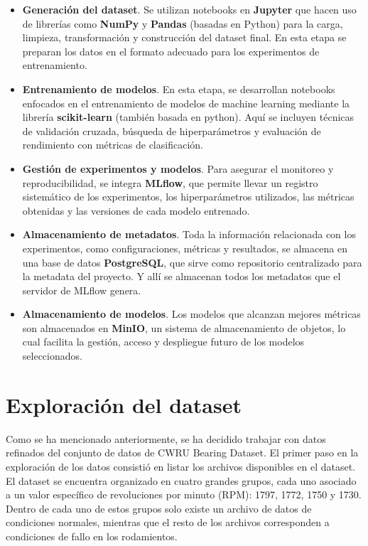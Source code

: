 \documentclass[11pt,a4paper,spanish]{book}
\numberwithin{equation}{chapter}
\numberwithin{figure}{chapter}
\begin{document}
\begin{itemize}

\item \textbf{Generación del dataset}. Se utilizan notebooks en \textbf{Jupyter} que hacen uso de librerías como \textbf{NumPy} y \textbf{Pandas} (basadas en Python) para la carga, limpieza, transformación y construcción del dataset final. En esta etapa se preparan los datos en el formato adecuado para los experimentos de entrenamiento.


\item \textbf{Entrenamiento de modelos}. En esta etapa, se desarrollan notebooks enfocados en el entrenamiento de modelos de machine learning mediante la librería \textbf{scikit-learn} (también basada en python). Aquí se incluyen técnicas de validación cruzada, búsqueda de hiperparámetros y evaluación de rendimiento con métricas de clasificación.


\item \textbf{Gestión de experimentos y modelos}. Para asegurar el monitoreo y reproducibilidad, se integra \textbf{MLflow}, que permite llevar un registro sistemático de los experimentos, los hiperparámetros utilizados, las métricas obtenidas y las versiones de cada modelo entrenado.


\item \textbf{Almacenamiento de metadatos}.  Toda la información relacionada con los experimentos, como configuraciones, métricas y resultados, se almacena en una base de datos \textbf{PostgreSQL}, que sirve como repositorio centralizado para la metadata del proyecto. Y allí se almacenan todos los metadatos que el servidor de MLflow genera. 


\item \textbf{Almacenamiento de modelos}. Los modelos que alcanzan mejores métricas son almacenados en \textbf{MinIO}, un sistema de almacenamiento de objetos, lo cual facilita la gestión, acceso y despliegue futuro de los modelos seleccionados.

\end{itemize}


\section{Exploración del dataset}

Como se ha mencionado anteriormente, se ha decidido trabajar con datos refinados del conjunto de datos de CWRU Bearing Dataset. El primer paso en la exploración de los datos consistió en listar los archivos disponibles en el dataset. El dataset se encuentra organizado en cuatro grandes grupos, cada uno asociado a un valor específico de revoluciones por minuto (RPM): 1797, 1772, 1750 y 1730. Dentro de cada uno de estos grupos solo existe un archivo de datos de condiciones normales, mientras que el resto de los archivos corresponden a condiciones de fallo en los rodamientos.
\end{document}
